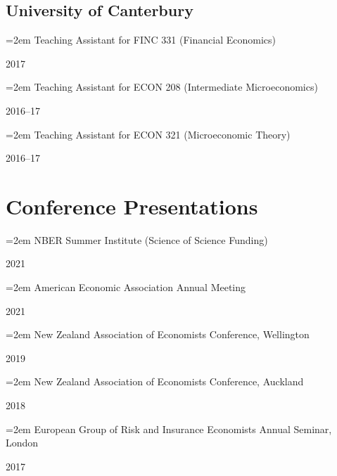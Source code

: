 \documentclass[11pt,oneside]{memoir}
\newcommand{\datedentry}[2]{\par\parbox[t]{0.9\linewidth}{\strut\raggedright\hangindent=2em #2\strut}\hfill#1}
\begin{document}
\subsection{University of Canterbury}
\datedentry{2017}{Teaching Assistant for FINC 331 (Financial Economics)}
\datedentry{2016--17}{Teaching Assistant for ECON 208 (Intermediate Microeconomics)}
\datedentry{2016--17}{Teaching Assistant for ECON 321 (Microeconomic Theory)}

\section{Conference Presentations}

\datedentry{2021}{NBER Summer Institute (Science of Science Funding)}
\datedentry{2021}{American Economic Association Annual Meeting}
\datedentry{2019}{New Zealand Association of Economists Conference, Wellington}
\datedentry{2018}{New Zealand Association of Economists Conference, Auckland}
\datedentry{2017}{European Group of Risk and Insurance Economists Annual Seminar, London}
\end{document}
